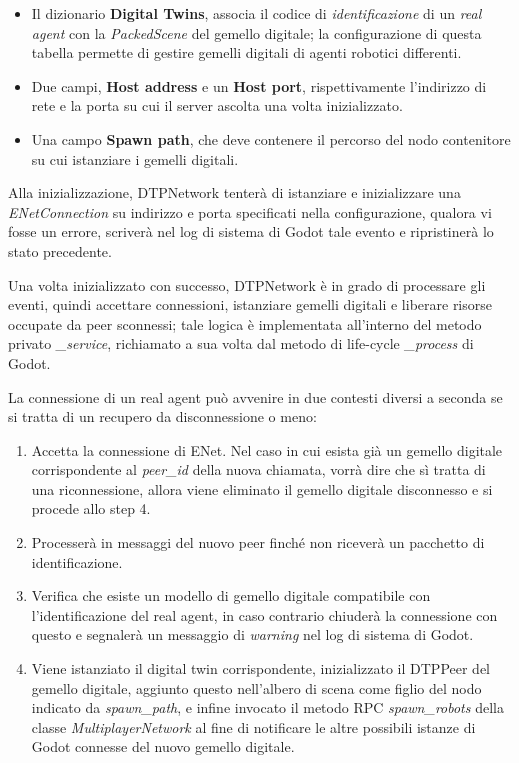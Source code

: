 \begin{itemize}
	\item Il dizionario \textbf{Digital Twins}, associa il codice di \textit{identificazione} di un \textit{real agent} con la \textit{PackedScene} del gemello digitale; la configurazione di questa tabella permette di gestire gemelli digitali di agenti robotici differenti.
	\item Due campi, \textbf{Host address} e un \textbf{Host port}, rispettivamente l'indirizzo di rete e la porta su cui il server ascolta una volta inizializzato.
	\item Una campo \textbf{Spawn path}, che deve contenere il percorso del nodo contenitore su cui istanziare i gemelli digitali.
\end{itemize}

Alla inizializzazione, DTPNetwork tenterà di istanziare e inizializzare una \textit{ENetConnection} su indirizzo e porta specificati nella configurazione, qualora vi fosse un errore, scriverà nel log di sistema di Godot tale evento e ripristinerà lo stato precedente.

Una volta inizializzato con successo, DTPNetwork è in grado di processare gli eventi, quindi accettare connessioni, istanziare gemelli digitali e liberare risorse occupate da peer sconnessi; tale logica è implementata all'interno del metodo privato \textit{\_service}, richiamato a sua volta dal metodo di life-cycle \textit{\_process} di Godot.

La connessione di un real agent può avvenire in due contesti diversi a seconda se si tratta di un recupero da disconnessione o meno:
\begin{enumerate}
	\item Accetta la connessione di ENet. Nel caso in cui esista già un gemello digitale corrispondente al \textit{peer\_id} della nuova chiamata, vorrà dire che sì tratta di una riconnessione, allora viene eliminato il gemello digitale disconnesso e si procede allo step 4.
	\item Processerà in messaggi del nuovo peer finché non riceverà un pacchetto di identificazione.
	\item Verifica che esiste un modello di gemello digitale compatibile con l'identificazione del real agent, in caso contrario chiuderà la connessione con questo e segnalerà un messaggio di \textit{warning} nel log di sistema di Godot.
	\item Viene istanziato il digital twin corrispondente, inizializzato il DTPPeer del gemello digitale, aggiunto questo nell'albero di scena come figlio del nodo indicato da \textit{spawn\_path}, e infine invocato il metodo RPC \textit{spawn\_robots} della classe \textit{MultiplayerNetwork} al fine di notificare le altre possibili istanze di Godot connesse del nuovo gemello digitale.
\end{enumerate}

